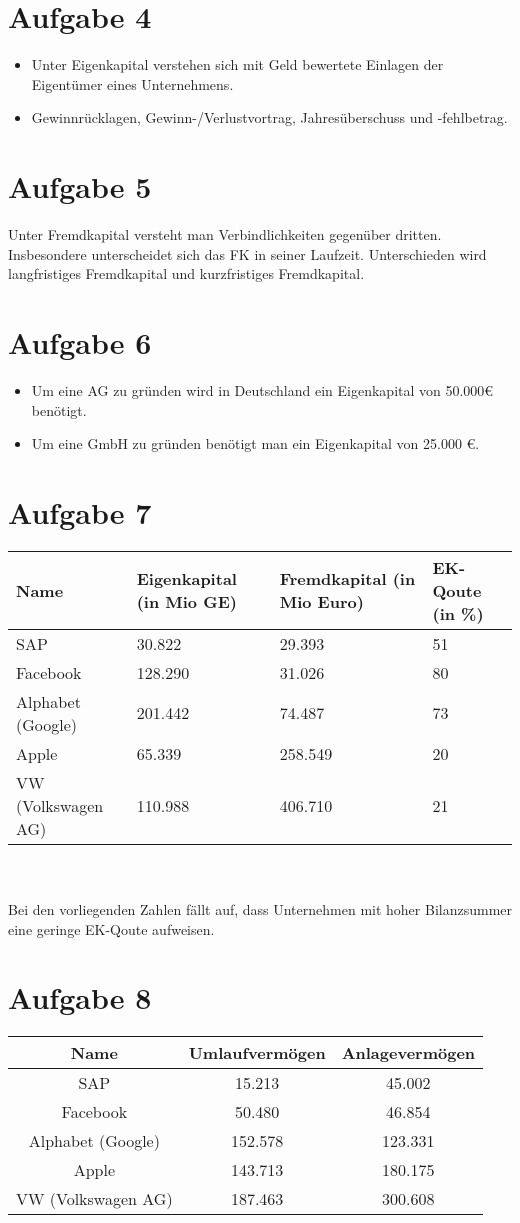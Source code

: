 \documentclass{article}
\begin{document}
	\section*{Aufgabe 4}
	\begin{itemize}
		\item Unter Eigenkapital verstehen sich mit Geld bewertete Einlagen der Eigentümer eines Unternehmens.
		\item Gewinnrücklagen, Gewinn-/Verlustvortrag, Jahresüberschuss und -fehlbetrag.
	\end{itemize}
	\section*{Aufgabe 5}
	Unter Fremdkapital versteht man Verbindlichkeiten gegenüber dritten. Insbesondere unterscheidet sich das FK in seiner Laufzeit. Unterschieden wird langfristiges Fremdkapital und kurzfristiges Fremdkapital.
	
	\section*{Aufgabe 6}
	\begin{itemize}
		\item Um eine AG zu gründen wird in Deutschland ein Eigenkapital von 50.000€ benötigt.
		\item Um eine GmbH zu gründen benötigt man ein Eigenkapital von 25.000 €.
	\end{itemize}
	\section*{Aufgabe 7}
	\begin{tabular}[l]{l|l|l|l}
		Name & Eigenkapital (in Mio GE) & Fremdkapital (in Mio Euro) & EK-Qoute (in \%) \\
		\hline
		SAP & 30.822 &29.393& 51\\
		Facebook &128.290 & 31.026 & 80\\
		Alphabet (Google)&201.442&74.487& 73 \\
		Apple &65.339&258.549&20\\
		VW (Volkswagen AG)&110.988&406.710&21 \\
		
	\end{tabular} \\ \\
	Bei den vorliegenden Zahlen fällt auf, dass Unternehmen mit hoher Bilanzsummer eine geringe EK-Qoute aufweisen. 
	\section*{Aufgabe 8}
	\begin{tabular}[h]{c|c|c}
		Name & Umlaufvermögen & Anlagevermögen \\
		\hline
		SAP &15.213&45.002 \\
		Facebook &50.480&46.854 \\
		Alphabet (Google)&152.578&123.331 \\
		Apple &143.713&180.175 \\
		VW (Volkswagen AG)&187.463&300.608 \\
	\end{tabular} \\ \\
\end{document}
